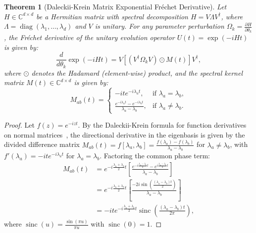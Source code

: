 \documentclass[aps,prx,twocolumn,superscriptaddress,nofootinbib]{revtex4-2}
\newcommand{\diag}{\operatorname{diag}}
\newtheorem{theorem}{Theorem}
\begin{document}
\begin{theorem}[Daleckii-Krein Matrix Exponential Fr\'echet Derivative]
Let $H \in \mathbb{C}^{d \times d}$ be a Hermitian matrix with spectral decomposition $H = V \Lambda V^\dagger$, where $\Lambda = \diag(\lambda_1, \dots, \lambda_d)$ and $V$ is unitary. For any parameter perturbation $\Omega_k = \frac{\partial H}{\partial \theta_k}$, the Fr\'echet derivative of the unitary evolution operator $U(t) = \exp(-i H t)$ is given by:
\begin{equation}
    \frac{d}{d\theta_k} \exp(-i H t) = V \left[ (V^\dagger \Omega_k V) \odot M(t) \right] V^\dagger,
\end{equation}
where $\odot$ denotes the Hadamard (element-wise) product, and the spectral kernel matrix $M(t) \in \mathbb{C}^{d \times d}$ is given by:
\begin{equation}
    M_{ab}(t) = \begin{cases}
        -i t e^{-i \lambda_a t}, & \text{if } \lambda_a = \lambda_b, \\
        \frac{e^{-i \lambda_a t} - e^{-i \lambda_b t}}{\lambda_a - \lambda_b}, & \text{if } \lambda_a \neq \lambda_b.
    \end{cases}
\end{equation}
\end{theorem}

\begin{proof}
Let $f(z) = e^{-i z t}$. By the Daleckii-Krein formula for function derivatives on normal matrices~\cite{daleckii1974stability,mathias1996chain}, the directional derivative in the eigenbasis is given by the divided difference matrix $M_{ab}(t) = f[\lambda_a, \lambda_b] = \frac{f(\lambda_a) - f(\lambda_b)}{\lambda_a - \lambda_b}$ for $\lambda_a \neq \lambda_b$, with $f'(\lambda_a) = -i t e^{-i \lambda_a t}$ for $\lambda_a = \lambda_b$. Factoring the common phase term:
\begin{align}
    M_{ab}(t) &= e^{-i \frac{\lambda_a + \lambda_b}{2} t} \left[ \frac{e^{-i \frac{\lambda_a - \lambda_b}{2} t} - e^{i \frac{\lambda_a - \lambda_b}{2} t}}{\lambda_a - \lambda_b} \right] \nonumber \\
    &= e^{-i \frac{\lambda_a + \lambda_b}{2} t} \left[ \frac{-2i \sin\left(\frac{(\lambda_a - \lambda_b) t}{2}\right)}{\lambda_a - \lambda_b} \right] \nonumber \\
    &= -i t e^{-i \frac{\lambda_a + \lambda_b}{2} t} \operatorname{sinc}\left( \frac{(\lambda_a - \lambda_b) t}{2\pi} \right),
\end{align}
where $\operatorname{sinc}(u) = \frac{\sin(\pi u)}{\pi u}$ with $\operatorname{sinc}(0) = 1$.
\end{proof}
\end{document}

